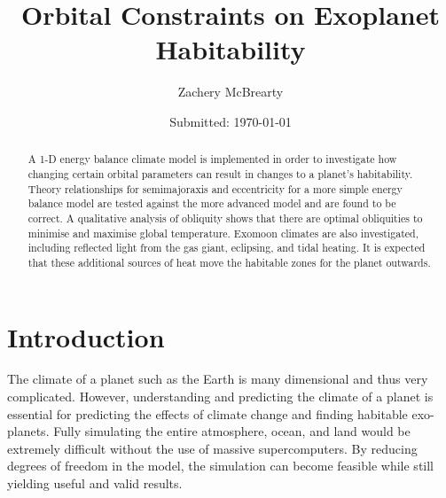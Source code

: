 \documentclass[12pt, onecolumn]{revtex4-2}    %
\begin{document}
\title{Orbital Constraints on Exoplanet Habitability}
\date{Submitted: \today{}}
\author{Zachery McBrearty}

\begin{abstract}

    A 1-D energy balance climate model is implemented in order to investigate how changing certain orbital parameters can result in changes to a planet's habitability.
    Theory relationships for semimajoraxis and eccentricity for a more simple energy balance model are tested against the more advanced model and are found to be correct.
    A qualitative analysis of obliquity shows that there are optimal obliquities to minimise and maximise global temperature.
    Exomoon climates are also investigated, including reflected light from the gas giant, eclipsing, and tidal heating.
    It is expected that these additional sources of heat move the habitable zones for the planet outwards.

\end{abstract}


\maketitle

\tableofcontents

\newpage

\section{Introduction}

The climate of a planet such as the Earth is many dimensional and thus very complicated.
However, understanding and predicting the climate of a planet is essential for predicting the effects of climate change and finding habitable exo-planets.
Fully simulating the entire atmosphere, ocean, and land would be extremely difficult without the use of massive supercomputers.
By reducing degrees of freedom in the model, the simulation can become feasible while still yielding useful and valid results.
\end{document}
